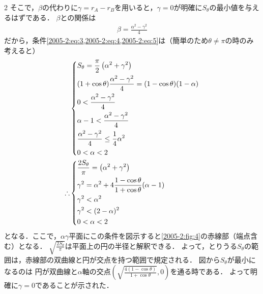 \documentclass[../../main.tex]{subfiles}
\begin{document}
\begin{multicols}{2}
  そこで，$\beta$の代わりに$\gamma=r_{A}-r_{B}$を用いると，$\gamma=0$が明確に$S_{\theta}$の最小値を与えるはずである．
  $\beta$との関係は
  \begin{align*}
    \beta = \frac{\alpha^2 -\gamma^2}{4}
  \end{align*}
  だから，条件\cref{2005-2:eq:3,2005-2:eq:4,2005-2:eq:5}は（簡単のため$\theta\neq\pi$の時のみ考えると）
  \begin{align*}
     & \begin{dcases}
         S_{\theta} = \frac{\pi}{2}\left(\alpha^2+\gamma^2\right)              \\
         (1+\cos\theta)\frac{\alpha^2 -\gamma^2}{4} = (1-\cos\theta)(1-\alpha) \\
         0 < \frac{\alpha^2 -\gamma^2}{4}                                      \\
         \alpha-1 < \frac{\alpha^2 -\gamma^2}{4}                               \\
         \frac{\alpha^2 -\gamma^2}{4} \le \frac{1}{4}\alpha^2                  \\
         0 < \alpha < 2
       \end{dcases}                \\
    \therefore
     & \begin{dcases}
         \frac{2S_{\theta}}{\pi} = \left(\alpha^2+\gamma^2\right)           \\
         \gamma^2 = \alpha^2 + 4\frac{1-\cos\theta}{1+\cos\theta}(\alpha-1) \\
         \gamma^2 < \alpha^2                                                \\
         \gamma^2 < (2-\alpha)^2                                            \\
         0 < \alpha < 2
       \end{dcases}
  \end{align*}
  となる．ここで，$\alpha\gamma$平面にこの条件を図示すると\cref{2005-2:fig:4}の赤線部（端点含む）となる．
  $\sqrt{\frac{2S_{\theta}}{\pi}}$は平面上の円の半径と解釈できる．
  よって，とりうる$S_{\theta}$の範囲は，赤線部の双曲線と円が交点を持つ範囲で規定される．
  図から$S_{\theta}$が最小になるのは
  円が双曲線と$\alpha$軸の交点$(\sqrt{\frac{4(1-\cos\theta)}{1+\cos\theta}},0)$を通る時である．
  よって明確に$\gamma=0$であることが示された．


\end{multicols}
\end{document}
